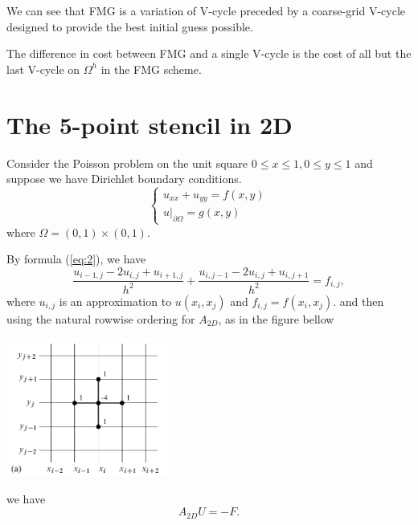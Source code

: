 \begin{rem}
  We can see that FMG is a variation of V-cycle
  preceded by a coarse-grid V-cycle designed to provide the
  best initial guess possible.
\end{rem}

\begin{exc}
  The difference in cost between FMG and a single V-cycle
  is the cost of all but the last V-cycle on $\Omega^h$
  in the FMG scheme.
  
\end{exc}

\section{The 5-point stencil in 2D}
\label{sec:5-point-stencil}
\begin{exm}
  Consider the Poisson problem on the unit square
  $0\leq x\leq 1,0\leq y\leq 1$
  and suppose we have Dirichlet boundary conditions.
  \begin{displaymath}
    \begin{cases}
      u_{xx}+u_{yy}=f(x,y)\\
      u\vert_{\partial \Omega}=g(x,y)
    \end{cases}
  \end{displaymath}
  where $\Omega=(0,1)\times (0,1).$
\end{exm}
By formula (\ref{eq:2}), we have
\begin{equation}
  \label{eq:2-D-laplacian}
    \frac{u_{i-1,j}-2u_{i,j}+u_{i+1,j}}{h^2}+
    \frac{u_{i,j-1}-2u_{i,j}+u_{i,j+1}}{h^2}
    =f_{i,j},
  \end{equation}
  where $u_{i,j}$ is an approximation to $u(x_i,x_j)$
  and $f_{i,j}=f(x_i,x_j).$
and then using the natural rowwise ordering for $A_{2D}$,
as in the figure bellow
\begin{center}
  \includegraphics[width=0.4\textwidth]
  {png/rowwise.png}
\end{center}

\begin{rem}
  we have
  \begin{equation}
    \label{eq:2-Dpossion}
    A_{2D}U=-F.
  \end{equation}
\end{rem}


